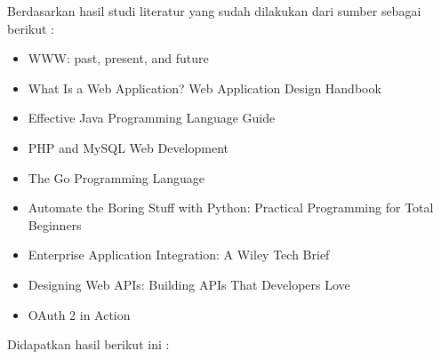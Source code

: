 Berdasarkan hasil studi literatur yang sudah dilakukan dari sumber sebagai berikut :
    \begin{itemize}
        \item WWW: past, present, and future
        \item What Is a Web Application? Web Application Design Handbook
        \item Effective Java Programming Language Guide
        \item PHP and MySQL Web Development
        \item The Go Programming Language
        \item Automate the Boring Stuff with Python: Practical Programming for Total Beginners
        \item Enterprise Application Integration: A Wiley Tech Brief
        \item Designing Web APIs: Building APIs That Developers Love
        \item OAuth 2 in Action
    \end{itemize}
Didapatkan hasil berikut ini :
